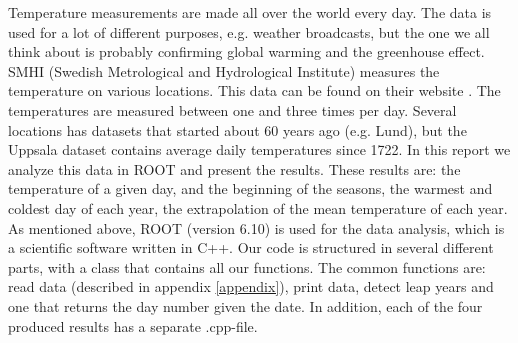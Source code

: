 

Temperature measurements are made all over the world every day. The data is used for a lot of different purposes, e.g. weather broadcasts, but the one we all think about is probably confirming global warming and the greenhouse effect.
SMHI (Swedish Metrological and Hydrological Institute) measures the temperature on various locations. This data can be found on their website \cite{smhidata}. The temperatures are measured between one and three times per day. Several locations has datasets that started about 60 years ago (e.g. Lund), but the Uppsala dataset contains average daily temperatures since 1722. In this report we analyze this data in ROOT and present the results. These results are: the temperature of a given day, and the beginning of the seasons, the warmest and coldest day of each year, the extrapolation of the mean temperature of each year.
As mentioned above, ROOT (version 6.10) is used for the data analysis, which is a scientific software written in C++. Our code is structured in several different parts, with a class that contains all our functions. The common functions are: read data (described in appendix \ref{appendix}), print data, detect leap years and one that returns the day number given the date. In addition, each of the four produced results has a separate .cpp-file. 


